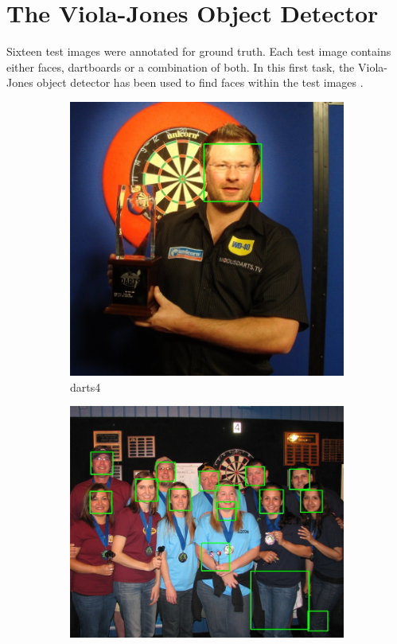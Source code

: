 \documentclass[conference]{IEEEtran}
\begin{document}
\section{The Viola-Jones Object Detector}
\vspace{-0.15cm}
Sixteen test images were annotated for ground truth. Each test image contains either faces, dartboards or a combination of both. In this first task, the Viola-Jones object detector has been used to find faces within the test images \cite{viola2001rapid}. 
\begin{figure}[htb]
\centering
\begin{subfigure}{.5\linewidth}
  \centering
  \includegraphics[width=.9\linewidth]{images/detected0.jpg}
  \caption{darts4}
  \label{fig:sub1}
\end{subfigure}%
\begin{subfigure}{.5\linewidth}
  \centering
  \vspace{0.6cm}
  \includegraphics[width=.9\linewidth]{images/detected1.jpg}

\end{subfigure}
\end{figure}
\end{document}
